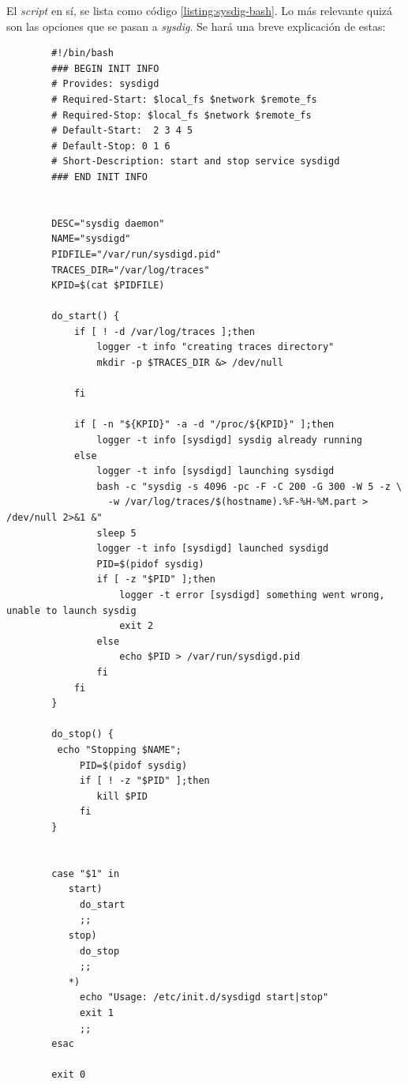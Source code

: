 El \emph{script} en sí, se lista como código \ref{listing:sysdig-bash}. Lo más relevante quizá
son las opciones que se pasan a \emph{sysdig}. Se hará una breve explicación de estas:
 \begin{verbatim}
        #!/bin/bash
        ### BEGIN INIT INFO
        # Provides: sysdigd
        # Required-Start: $local_fs $network $remote_fs
        # Required-Stop: $local_fs $network $remote_fs
        # Default-Start:  2 3 4 5
        # Default-Stop: 0 1 6
        # Short-Description: start and stop service sysdigd
        ### END INIT INFO
        
        
        DESC="sysdig daemon"
        NAME="sysdigd"
        PIDFILE="/var/run/sysdigd.pid"
        TRACES_DIR="/var/log/traces"
        KPID=$(cat $PIDFILE)
        
        do_start() {
            if [ ! -d /var/log/traces ];then
                logger -t info "creating traces directory"
                mkdir -p $TRACES_DIR &> /dev/null
        
            fi
        
            if [ -n "${KPID}" -a -d "/proc/${KPID}" ];then
                logger -t info [sysdigd] sysdig already running
            else
                logger -t info [sysdigd] launching sysdigd
                bash -c "sysdig -s 4096 -pc -F -C 200 -G 300 -W 5 -z \
                  -w /var/log/traces/$(hostname).%F-%H-%M.part > /dev/null 2>&1 &"
                sleep 5
                logger -t info [sysdigd] launched sysdigd
                PID=$(pidof sysdig)
                if [ -z "$PID" ];then
                    logger -t error [sysdigd] something went wrong, unable to launch sysdig
                    exit 2
                else
                    echo $PID > /var/run/sysdigd.pid
                fi
            fi
        }
        
        do_stop() {
         echo "Stopping $NAME";
             PID=$(pidof sysdig)
             if [ ! -z "$PID" ];then
                kill $PID
             fi
        }
        
        
        case "$1" in
           start)
             do_start
             ;;
           stop)
             do_stop
             ;;
           *)
             echo "Usage: /etc/init.d/sysdigd start|stop"
             exit 1
             ;;
        esac
        
        exit 0
    \end{verbatim}

